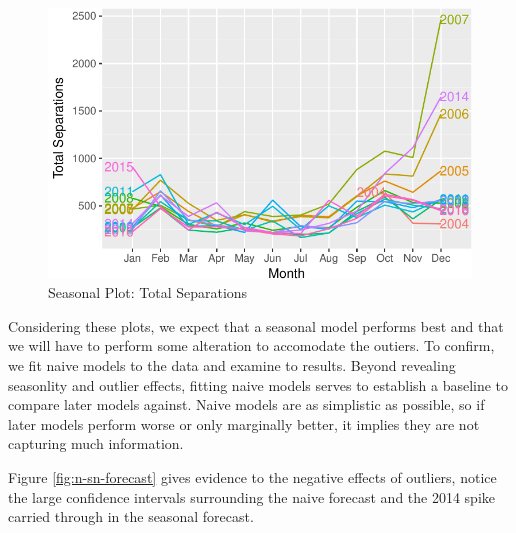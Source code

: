 \documentclass[12pt,letterpaper,toc=flat,oneside]{report}
\theoremstyle{definition}
\theoremstyle{definition}
\theoremstyle{definition}
\theoremstyle{remark}
\begin{document}
\begin{figure}[H]

{\centering \includegraphics{elliott-econometric-personnel-retention-18_files/figure-latex/response-season-plot-1} 

}

\caption{Seasonal Plot: Total Separations}\label{fig:response-season-plot}
\end{figure}

Considering these plots, we expect that a seasonal model performs best
and that we will have to perform some alteration to accomodate the
outiers. To confirm, we fit naive models to the data and examine to
results. Beyond revealing seasonlity and outlier effects, fitting naive
models serves to establish a baseline to compare later models against.
Naive models are as simplistic as possible, so if later models perform
worse or only marginally better, it implies they are not capturing much
information.

Figure \ref{fig:n-sn-forecast} gives evidence to the negative effects of
outliers, notice the large confidence intervals surrounding the naive
forecast and the 2014 spike carried through in the seasonal forecast.
\end{document}
